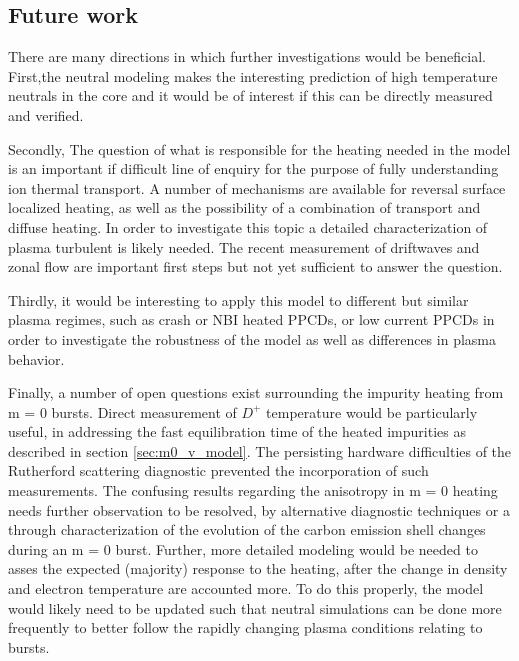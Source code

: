\begin{refsection}
\section{Future work}
There are many directions in which further investigations would be beneficial. First,the neutral modeling makes the interesting prediction of high temperature neutrals in the core and it would be of interest if this can be directly measured and verified. 

Secondly, The question of what is responsible for the \adhoc heating needed in the model is an important if difficult line of enquiry for the purpose of fully understanding ion thermal transport. A number of mechanisms are available for reversal surface localized heating, as well as the possibility of a combination of transport and diffuse heating. In order to investigate this topic a detailed characterization of plasma turbulent is likely needed. The recent measurement of driftwaves and zonal flow are important first steps but not yet sufficient to answer the question.

Thirdly, it would be interesting to apply this model to different but similar plasma regimes, such as crash or NBI heated PPCDs, or low current PPCDs in order to investigate the robustness of the model as well as differences in plasma behavior.

Finally, a number of open questions exist surrounding the impurity heating from m = 0 bursts. Direct measurement of $D^+$ temperature would be particularly useful, in addressing the fast equilibration time of the heated impurities as described in section \ref{sec:m0_v_model}. The persisting hardware difficulties of the Rutherford scattering diagnostic prevented the incorporation of such measurements. The confusing results regarding the anisotropy in m = 0 heating needs further observation to be resolved, by alternative diagnostic techniques or a through characterization of the evolution of the carbon emission shell changes during an m = 0  burst. Further, more detailed modeling would be needed to asses the expected (majority) response to the heating, after the change in density and electron temperature are accounted more. To do this properly, the model would likely need to be updated such that neutral simulations can be done more frequently to better follow the rapidly changing plasma conditions relating to bursts. 





\printbibliography
\end{refsection}